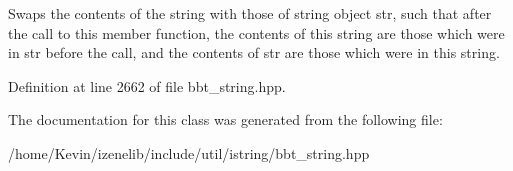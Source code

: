 Swaps the contents of the string with those of string object str, such that after the call to this member function, the contents of this string are those which were in str before the call, and the contents of str are those which were in this string. 

Definition at line 2662 of file bbt\_\-string.hpp.

The documentation for this class was generated from the following file:\begin{CompactItemize}
\item 
/home/Kevin/izenelib/include/util/istring/bbt\_\-string.hpp\end{CompactItemize}
